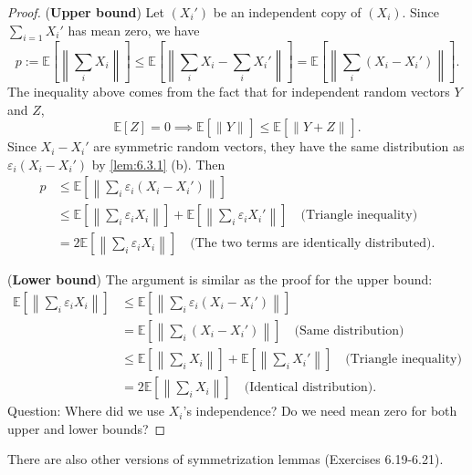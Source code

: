 \begin{proof}
(\textbf{Upper bound}) Let $(X_i')$ be an independent copy of $(X_i)$. Since $\sum_{i = 1}^{} X_i'$ has mean 
zero, we have 
\[ p := \mathbb{E}\left[ \left\lVert \sum_{i}^{} X_i \right\rVert \right] 
\leq \mathbb{E}\left[ \left\lVert \sum_{i}^{} X_i - \sum_{i}^{} X_i' \right\rVert \right] 
= \mathbb{E}\left[ \left\lVert \sum_{i}^{} (X_i - X_i') \right\rVert \right]. \]
The inequality above comes from the fact that for independent random vectors $Y$ and $Z$, 
\[ \mathbb{E}[Z] = 0 \implies \mathbb{E}[\lVert Y \rVert_{}] \leq \mathbb{E}[\lVert Y + Z \rVert_{}]. \]
Since $X_i - X_i'$ are symmetric random vectors, they have the same distribution as 
$\varepsilon_i (X_i - X_i')$ by \cref{lem:6.3.1} (b). Then 
\begin{align*}
	p 
	&\leq \mathbb{E}\left[ \left\lVert \sum_{i}^{} \varepsilon_i (X_i - X_i') \right\rVert \right] \\
	&\leq \mathbb{E}\left[ \left\lVert \sum_{i}^{} \varepsilon_i X_i \right\rVert \right] 
	+ \mathbb{E}\left[ \left\lVert \sum_{i}^{} \varepsilon_i X_i' \right\rVert \right] \quad 
	\text{(Triangle inequality)} \\
	&= 2 \mathbb{E}\left[ \left\lVert \sum_{i}^{} \varepsilon_i X_i \right\rVert \right] \quad 
	\text{(The two terms are identically distributed)}.
\end{align*}

(\textbf{Lower bound}) The argument is similar as the proof for the upper bound:
\begin{align*}
	\mathbb{E}\left[ \left\lVert \sum_{i}^{} \varepsilon_i X_i \right\rVert \right] 
	&\leq \mathbb{E}\left[ \left\lVert \sum_{i}^{} \varepsilon_i (X_i - X_i') \right\rVert \right] \\
	&= \mathbb{E}\left[ \left\lVert \sum_{i}^{} (X_i - X_i') \right\rVert \right] \quad 
	\text{(Same distribution)} \\
	&\leq \mathbb{E}\left[ \left\lVert \sum_{i}^{} X_i \right\rVert \right] 
	+ \mathbb{E}\left[ \left\lVert \sum_{i}^{} X_i' \right\rVert \right] \quad \text{(Triangle inequality)} \\
	&= 2 \mathbb{E}\left[ \left\lVert \sum_{i}^{} X_i \right\rVert \right] \quad 
	\text{(Identical distribution)}.
\end{align*}
Question: Where did we use $X_i$'s independence? Do we need mean zero for both upper and lower bounds?
\end{proof}

There are also other versions of symmetrization lemmas (Exercises 6.19-6.21).



